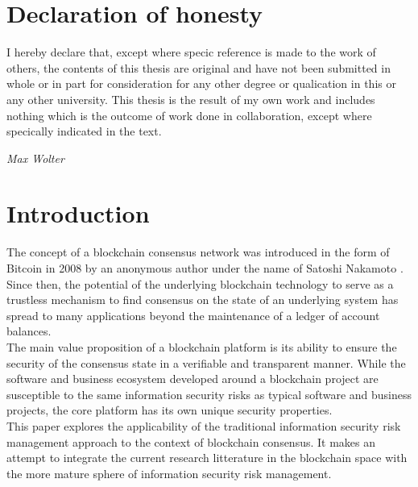 \documentclass[12pt,a4paper]{article}
\begin{document}
\newpage

\section*{Declaration of honesty}

I hereby declare that, except where specic reference is made to the work of
others, the contents of this thesis are original and have not been submitted
in whole or in part for consideration for any other degree or qualication
in this or any other university. This thesis is the result of my own work
and includes nothing which is the outcome of work done in collaboration,
except where specically indicated in the text.\\

\begin{displayquote}
  \textit{Max Wolter}
\end{displayquote}

\newpage

\onehalfspacing
\tableofcontents
\singlespacing
\newpage

\section{Introduction}

The concept of a blockchain consensus network was introduced in the form of Bitcoin in 2008 by an anonymous author under the name of Satoshi Nakamoto \cite{bitcoin}. Since then, the potential of the underlying blockchain technology to serve as a trustless mechanism to find consensus on the state of an underlying system has spread to many applications beyond the maintenance of a ledger of account balances.\\

The main value proposition of a blockchain platform is its ability to ensure the security of the consensus state in a verifiable and transparent manner. While the software and business ecosystem developed around a blockchain project are susceptible to the same information security risks as typical software and business projects, the core platform has its own unique security properties.\\

This paper explores the applicability of the traditional information security risk management approach to the context of blockchain consensus. It makes an attempt to integrate the current research litterature in the blockchain space with the more mature sphere of information security risk management.\\
\end{document}
